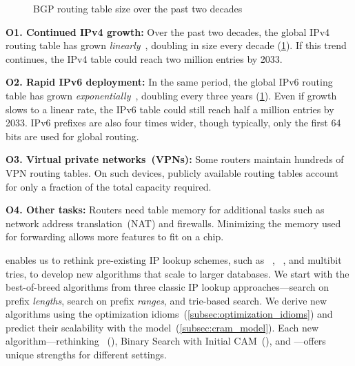 \begin{figure}[!t]
    \vspace{-1em}
    \caption{BGP routing table size over the past two decades}
    \label{fig:bgp_growth}
    \vspace{-\baselineskip}
\end{figure}

{\bf O1. Continued IPv4 growth:} Over the past two decades, the global IPv4 routing table has grown {\em linearly}~\cite{cidr_report_ipv4, bgp_report_ipv4}, doubling in size every decade (\cref{fig:bgp_growth}). If this trend continues, the IPv4 table could reach two million entries by 2033.

{\bf O2. Rapid IPv6 deployment:} In the same period, the global IPv6 routing table has grown {\em exponentially}~\cite{cidr_report_ipv6, bgp_report_ipv6}, doubling every three years (\cref{fig:bgp_growth}). Even if growth slows to a linear rate, the IPv6 table could still reach half a million entries by 2033. IPv6 prefixes are also four times wider, though typically, only the first 64 bits are used for global routing.

{\bf O3. Virtual private networks~(VPNs):} Some routers maintain hundreds of VPN routing tables. On such devices, publicly available routing tables account for only a fraction of the total capacity required.

{\bf O4. Other tasks:} Routers need table memory for additional tasks such as network address translation~(NAT) and firewalls. Minimizing the memory used for forwarding allows more features to fit on a chip.

\cram enables us to rethink pre-existing IP lookup schemes, such as \sail~\cite{sail}, \dxr~\cite{dxr}, and multibit tries, to develop new algorithms that scale to larger databases. We start with the best-of-breed algorithms from three classic IP lookup approaches---search on prefix {\em lengths}, search on prefix {\em ranges}, and trie-based search. We derive new algorithms using the optimization idioms~(\cref{subsec:optimization_idioms}) and predict their scalability with the \cram model~(\cref{subsec:cram_model}). Each new algorithm---rethinking \sail~(\resail), Binary Search with Initial CAM~(\bsic), and \mashup---offers unique strengths for different settings.

